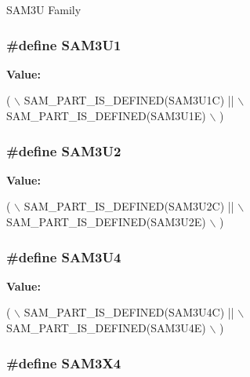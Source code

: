 S\-A\-M3\-U Family \hypertarget{group__sam__part__macros__group_gae39c5d03b1af93b2864e5f72908a0ff3}{
\subsubsection[{S\-A\-M3\-U1}]{\setlength{\rightskip}{0pt plus 5cm}\#define S\-A\-M3\-U1}}\label{group__sam__part__macros__group_gae39c5d03b1af93b2864e5f72908a0ff3}
{\bfseries Value\-:}
\begin{DoxyCode}
( \(\backslash\)
                SAM\_PART\_IS\_DEFINED(SAM3U1C) || \(\backslash\)
                SAM\_PART\_IS\_DEFINED(SAM3U1E) \(\backslash\)
                )
\end{DoxyCode}
\hypertarget{group__sam__part__macros__group_ga0feb884f39921517436f269c86914cb0}{
\subsubsection[{S\-A\-M3\-U2}]{\setlength{\rightskip}{0pt plus 5cm}\#define S\-A\-M3\-U2}}\label{group__sam__part__macros__group_ga0feb884f39921517436f269c86914cb0}
{\bfseries Value\-:}
\begin{DoxyCode}
( \(\backslash\)
                SAM\_PART\_IS\_DEFINED(SAM3U2C) || \(\backslash\)
                SAM\_PART\_IS\_DEFINED(SAM3U2E) \(\backslash\)
                )
\end{DoxyCode}
\hypertarget{group__sam__part__macros__group_ga2af1cda107cbae1f393bce7a6c659a98}{
\subsubsection[{S\-A\-M3\-U4}]{\setlength{\rightskip}{0pt plus 5cm}\#define S\-A\-M3\-U4}}\label{group__sam__part__macros__group_ga2af1cda107cbae1f393bce7a6c659a98}
{\bfseries Value\-:}
\begin{DoxyCode}
( \(\backslash\)
                SAM\_PART\_IS\_DEFINED(SAM3U4C) || \(\backslash\)
                SAM\_PART\_IS\_DEFINED(SAM3U4E) \(\backslash\)
                )
\end{DoxyCode}
\hypertarget{group__sam__part__macros__group_ga735357bdbbd05356a7829e517fb4203f}{
\subsubsection[{S\-A\-M3\-X4}]{\setlength{\rightskip}{0pt plus 5cm}\#define S\-A\-M3\-X4}}\label{group__sam__part__macros__group_ga735357bdbbd05356a7829e517fb4203f}
